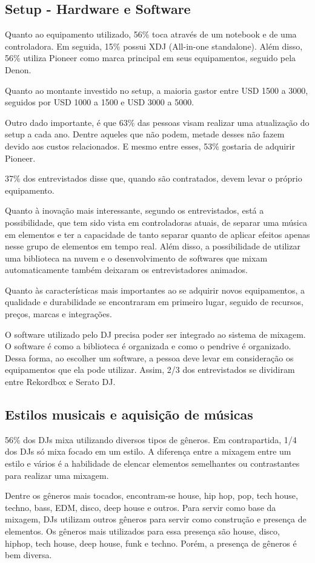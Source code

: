 \subsection{Setup - Hardware e Software}
Quanto ao equipamento utilizado, 56\% toca através de um notebook e de uma controladora. Em seguida, 15\% possui XDJ (All-in-one standalone). Além disso, 56\% utiliza Pioneer como marca principal em seus equipamentos, seguido pela Denon. 
\par
Quanto ao montante investido no setup, a maioria gastor entre USD 1500 a 3000, seguidos por USD 1000 a 1500 e USD 3000 a 5000.
\par
Outro dado importante, é que 63\% das pessoas visam realizar uma atualização do setup a cada ano. Dentre aqueles que não podem, metade desses não fazem devido aos custos relacionados. E mesmo entre esses, 53\% gostaria de adquirir Pioneer. 
\par
37\% dos entrevistados disse que, quando são contratados, devem levar o próprio equipamento.
\par
Quanto à inovação mais interessante, segundo os entrevistados, está a possibilidade, que tem sido vista em controladoras atuais, de separar uma música em elementos e ter a capacidade de tanto separar quanto de aplicar efeitos apenas nesse grupo de elementos em tempo real. Além disso, a possibilidade de utilizar uma biblioteca na nuvem e o desenvolvimento de softwares que mixam automaticamente também deixaram os entrevistadores animados. 
\par
Quanto às características mais importantes ao se adquirir novos equipamentos, a qualidade e durabilidade se encontraram em primeiro lugar, seguido de recursos, preços, marcas e integrações.
\par
O software utilizado pelo DJ precisa poder ser integrado ao sistema de mixagem. O software é como a biblioteca é organizada e como o pendrive é organizado. Dessa forma, ao escolher um software, a pessoa deve levar em consideração os equipamentos que ela pode utilizar. Assim, 2/3 dos entrevistados se dividiram entre Rekordbox e Serato DJ.

\subsection{Estilos musicais e aquisição de músicas}

56\% dos DJs mixa utilizando diversos tipos de gêneros. Em contrapartida, 1/4 dos DJs só mixa focado em um estilo. A diferença entre a mixagem entre um estilo e vários é a habilidade de elencar elementos semelhantes ou contrastantes para realizar uma mixagem.
\par
Dentre os gêneros mais tocados, encontram-se house, hip hop, pop, tech house, techno, bass, EDM, disco, deep house e outros. Para servir como base da mixagem, DJs utilizam outros gêneros para servir como construção e presença de elementos. Os gêneros mais utilizados para essa presença são house, disco, hiphop, tech house, deep house, funk e techno. Porém, a presença de gêneros é bem diversa.
